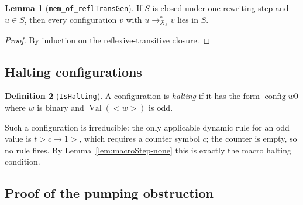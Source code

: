 \documentclass[11pt,a4paper]{article}
\theoremstyle{definition}
\newtheorem{definition}{Definition}[section]
\newtheorem{lemma}[definition]{Lemma}
\newcommand{\lt}{<}
\newcommand{\gt}{>}
\newcommand{\val}{\operatorname{Val}}
\newcommand{\config}{\operatorname{config}}
\newcommand{\antihydraSRS}{\mathcal{R}_{A}}
\begin{document}
\begin{lemma}[\texttt{mem\_of\_reflTransGen}]
\label{lem:mem-reflTransGen}
If $S$ is closed under one rewriting step and $u\in S$, then every
configuration $v$ with $u\to^{*}_{\antihydraSRS}v$ lies in $S$.
\end{lemma}
\begin{proof}
By induction on the reflexive-transitive closure.
\end{proof}

\subsection{Halting configurations}

\begin{definition}[\texttt{IsHalting}]
\label{def:halting}
A configuration is \emph{halting} if it has the form $\config{w}{0}$
where $w$ is binary and $\val(\lt w\gt)$ is odd.
\end{definition}

Such a configuration is irreducible: the only applicable dynamic rule for
an odd value is $t\gt c\to1\gt$, which requires a counter symbol $c$; the
counter is empty, so no rule fires.  By Lemma~\ref{lem:macroStep-none} this
is exactly the macro halting condition.

\subsection{Proof of the pumping obstruction}
\end{document}
